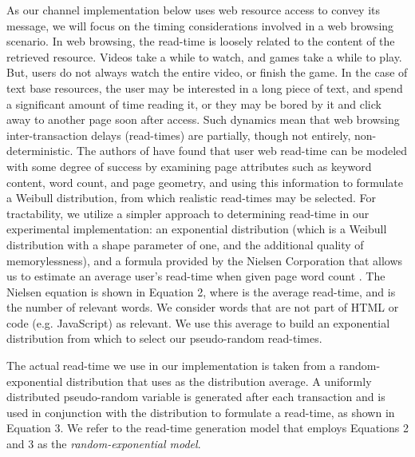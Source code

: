 \documentclass[10pt, conference]{IEEEtran}
\begin{document}
As our channel implementation below uses web resource access to convey its message, we will focus on the timing considerations involved in a web browsing scenario.  In web browsing, the read-time is loosely related to the content of the retrieved resource.  Videos take a while to watch, and games take a while to play.  But, users do not always watch the entire video, or finish the game.  In the case of text base resources, the user may be interested in a long piece of text, and spend a significant amount of time reading it, or they may be bored by it and click away to another page soon after access.  Such dynamics mean that web browsing inter-transaction delays (read-times) are partially, though not entirely, non-deterministic.  The authors of \cite{Liu10} have found that user web read-time can be modeled with some degree of success by examining page attributes such as keyword content, word count, and page geometry, and using this information to formulate a Weibull distribution, from which realistic read-times may be selected.  For tractability, we utilize a simpler approach to determining read-time in our experimental implementation: an exponential distribution (which is a Weibull distribution with a shape parameter of one, and the additional quality of memorylessness), and a formula provided by the Nielsen Corporation that allows us to estimate an average user's read-time when given page word count \cite{Nielsen08}.  The Nielsen equation is shown in Equation 2, where  is the average read-time, and  is the number of relevant words.  We consider words that are not part of HTML or code (e.g. JavaScript) as relevant.  We use this average to build an exponential distribution from which to select our pseudo-random read-times.



The actual read-time we use in our implementation is taken from a random-exponential distribution that uses  as the distribution average.  A uniformly distributed pseudo-random variable  is generated after each transaction and is used in conjunction with the distribution to formulate a read-time, as shown in Equation 3.  We refer to the read-time generation model that employs Equations 2 and 3 as the {\em random-exponential model}.
\end{document}
